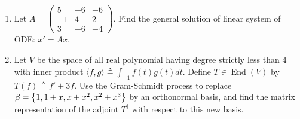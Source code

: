 \documentclass{report}
\begin{document}
\begin{question}{}{}
\begin{enumerate}[label=(\alph*)]
  \item Let $A=\begin{pmatrix} 
      5 & -6 & -6 \\
      -1 & 4 & 2 \\
      3 & -6 & -4
  \end{pmatrix}$. Find the general solution of linear system of ODE: $x'=Ax$. 
  \item Let $V$ be the space of all real polynomial having degree strictly less than $4$ with  inner product $\langle f,g\rangle \triangleq \int_{-1}^1 f(t)g(t)dt$. Define $T\in \operatorname{End}(V)$ by $T(f)\triangleq f'+3f$. Use the Gram-Schmidt process to replace $\beta = \left\{ 1,1+x,x+x^2,x^2+x^3 \right\}$ by an orthonormal basis, and find the matrix representation of the adjoint $T^\dagger $ with respect to this new basis. 
\end{enumerate}
\end{question}
\end{document}
